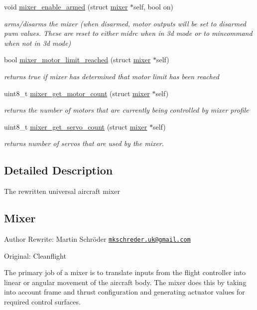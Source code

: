 \begin{DoxyCompactItemize}
void \hyperlink{group__MIXER_ga2250ad03e802112ed15b702ba86faaf4}{mixer\+\_\+enable\+\_\+armed} (struct \hyperlink{structmixer}{mixer} $\ast$self, bool on)
\begin{DoxyCompactList}\small\item\em arms/disarms the mixer (when disarmed, motor outputs will be set to disarmed pwm values. These are reset to either midrc when in 3d mode or to mincommand when not in 3d mode) \end{DoxyCompactList}\item 
bool \hyperlink{group__MIXER_gad159e060c41bada3e06ecb889517533e}{mixer\+\_\+motor\+\_\+limit\+\_\+reached} (struct \hyperlink{structmixer}{mixer} $\ast$self)
\begin{DoxyCompactList}\small\item\em returns true if mixer has determined that motor limit has been reached \end{DoxyCompactList}\item 
uint8\+\_\+t \hyperlink{group__MIXER_gab6ecb3be636e39dc1582e4bb448c3bf7}{mixer\+\_\+get\+\_\+motor\+\_\+count} (struct \hyperlink{structmixer}{mixer} $\ast$self)
\begin{DoxyCompactList}\small\item\em returns the number of motors that are currently being controlled by mixer profile \end{DoxyCompactList}\item 
uint8\+\_\+t \hyperlink{group__MIXER_gaec0e6d4ba020b8ae1b3d593afdbd4586}{mixer\+\_\+get\+\_\+servo\+\_\+count} (struct \hyperlink{structmixer}{mixer} $\ast$self)
\begin{DoxyCompactList}\small\item\em returns number of servos that are used by the mixer. \end{DoxyCompactList}\end{DoxyCompactItemize}


\subsection{Detailed Description}
The rewritten universal aircraft mixer

\subsection*{Mixer }

\begin{DoxyAuthor}{Author}
Rewrite\+: Martin Schröder \href{mailto:mkschreder.uk@gmail.com}{\tt mkschreder.\+uk@gmail.\+com} 

Original\+: Cleanflight
\end{DoxyAuthor}
The primary job of a mixer is to translate inputs from the flight controller into linear or angular movement of the aircraft body. The mixer does this by taking into account frame and thrust configuration and generating actuator values for required control surfaces.

